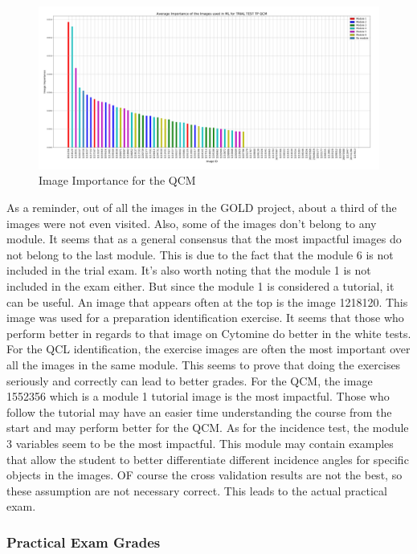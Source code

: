 \documentclass[a4paper,11pt]{report}
\numberwithin{figure}{section} %
\begin{document}
      \begin{figure}[H]
      \centering
      \includegraphics[width=.95\linewidth]{plots/im_importance_TRIAL_TEST_TP_QCM_2018-04-29_14_34_19.png}
      \caption{Image Importance for the QCM}
      \label{fig:im_white3}
      \end{figure}
    
    As a reminder, out of all the images in the GOLD project, about a third of the images were not even visited.
    Also, some of the images don't belong to any module.
    It seems that as a general consensus that the most impactful images do not belong to the last module.
    This is due to the fact that the module 6 is not included in the trial exam.
    It's also worth noting that the module 1 is not included in the exam either.
    But since the module 1 is considered a tutorial, it can be useful.
    An image that appears often at the top is the image 1218120.
    This image was used for a preparation identification exercise.
    It seems that those who perform better in regards to that image on Cytomine do better in the white tests.
    For the QCL identification, the exercise images are often the most important over all the images in the same module.
    This seems to prove that doing the exercises seriously and correctly can lead to better grades.
    For the QCM, the image 1552356 which is a module 1 tutorial image is the most impactful.
    Those who follow the tutorial may have an easier time understanding the course from the start and may perform better for the QCM. As for the incidence test, the module 3 variables seem to be the most impactful.
    This module may contain examples that allow the student to better differentiate different incidence angles for specific objects in the images.
    OF course the cross validation results are not the best, so these assumption are not necessary correct. This leads to the actual practical exam.
    
    \subsubsection{Practical Exam Grades}
\end{document}
